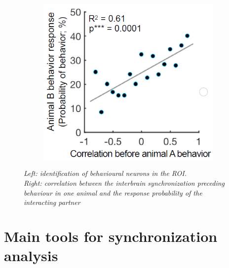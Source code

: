\documentclass[12pt, a4paper]{report}
\begin{document}
\begin{figure}[H]
\begin{minipage}{\linewidth}
\begin{minipage}{0.35\linewidth}
\begin{figure}[H]
			\end{figure}
		\end{minipage}
		\hspace{0.05\linewidth}
		\begin{minipage}{0.4\linewidth}
			\begin{figure}[H]
				\includegraphics[width=\linewidth]{kingsbury3.png}
				
			\end{figure}
		\end{minipage}
		
	\end{minipage}
	\caption{\textit{Left: identification of behavioural neurons in the ROI. \\
			Right: correlation between the interbrain synchronization preceding behaviour in one animal and the response probability of the interacting partner}}
\end{figure}

\newpage



\chapter{Main tools for synchronization analysis} 
\end{document}
